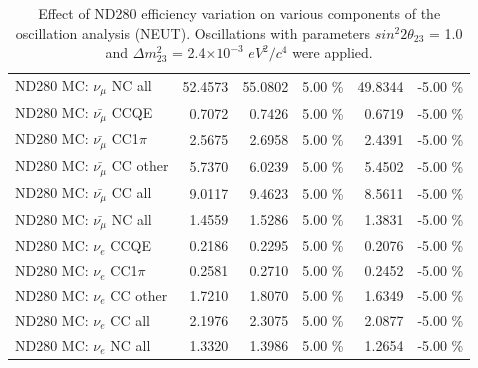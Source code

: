 \begin{table}
\begin{tabular}{| l | r | r  r | r  r |}
                                          ND280 MC: $\nu_{\mu}$ NC all &         52.4573 &         55.0802 &  5.00 \%  &         49.8344 & -5.00 \%  \\ 
                                      ND280 MC: $\bar{\nu_{\mu}}$ CCQE &          0.7072 &          0.7426 &  5.00 \%  &          0.6719 & -5.00 \%  \\ 
                                  ND280 MC: $\bar{\nu_{\mu}}$ CC1$\pi$ &          2.5675 &          2.6958 &  5.00 \%  &          2.4391 & -5.00 \%  \\ 
                                  ND280 MC: $\bar{\nu_{\mu}}$ CC other &          5.7370 &          6.0239 &  5.00 \%  &          5.4502 & -5.00 \%  \\ 
                                    ND280 MC: $\bar{\nu_{\mu}}$ CC all &          9.0117 &          9.4623 &  5.00 \%  &          8.5611 & -5.00 \%  \\ 
                                    ND280 MC: $\bar{\nu_{\mu}}$ NC all &          1.4559 &          1.5286 &  5.00 \%  &          1.3831 & -5.00 \%  \\ 
                                              ND280 MC: $\nu_{e}$ CCQE &          0.2186 &          0.2295 &  5.00 \%  &          0.2076 & -5.00 \%  \\ 
                                          ND280 MC: $\nu_{e}$ CC1$\pi$ &          0.2581 &          0.2710 &  5.00 \%  &          0.2452 & -5.00 \%  \\ 
                                          ND280 MC: $\nu_{e}$ CC other &          1.7210 &          1.8070 &  5.00 \%  &          1.6349 & -5.00 \%  \\ 
                                            ND280 MC: $\nu_{e}$ CC all &          2.1976 &          2.3075 &  5.00 \%  &          2.0877 & -5.00 \%  \\ 
                                            ND280 MC: $\nu_{e}$ NC all &          1.3320 &          1.3986 &  5.00 \%  &          1.2654 & -5.00 \%  \\ 
\hline
\end{tabular}
\caption{ 
  Effect of ND280 efficiency variation
  on various components of the oscillation analysis (NEUT).
  Oscillations with parameters $sin^{2}2\theta_{23}$ = 1.0 and $\Delta m^{2}_{23}$ = 2.4$\times10^{-3}$ $eV^{2}/c^{4}$ were applied.  
}
\label{tab:neut_nd280_eff}
\end{table}


%
%
%
%

